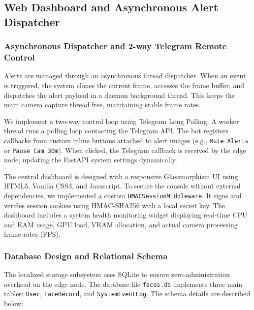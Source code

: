 \documentclass[12pt,a4paper]{article}
\begin{document}
\subsection{Web Dashboard and Asynchronous Alert Dispatcher}

\subsubsection*{Asynchronous Dispatcher and 2-way Telegram Remote Control}
Alerts are managed through an asynchronous thread dispatcher. When an event is triggered, the system clones the current frame, accesses the frame buffer, and dispatches the alert payload in a daemon background thread. This keeps the main camera capture thread free, maintaining stable frame rates.

We implement a two-way control loop using Telegram Long Polling. A worker thread runs a polling loop contacting the Telegram API. The bot registers callbacks from custom inline buttons attached to alert images (e.g., \texttt{Mute Alerts} or \texttt{Pause Cam 30m}). When clicked, the Telegram callback is received by the edge node, updating the FastAPI system settings dynamically.

The central dashboard is designed with a responsive Glassmorphism UI using HTML5, Vanilla CSS3, and Javascript. 
To secure the console without external dependencies, we implemented a custom \texttt{HMACSessionMiddleware}. It signs and verifies session cookies using HMAC-SHA256 with a local secret key. The dashboard includes a system health monitoring widget displaying real-time CPU and RAM usage, GPU load, VRAM allocation, and actual camera processing frame rates (FPS).

\subsubsection*{Database Design and Relational Schema}
The localized storage subsystem uses SQLite to ensure zero-administration overhead on the edge node. The database file \texttt{faces.db} implements three main tables: \texttt{User}, \texttt{FaceRecord}, and \texttt{SystemEventLog}. The schema details are described below:
\end{document}
